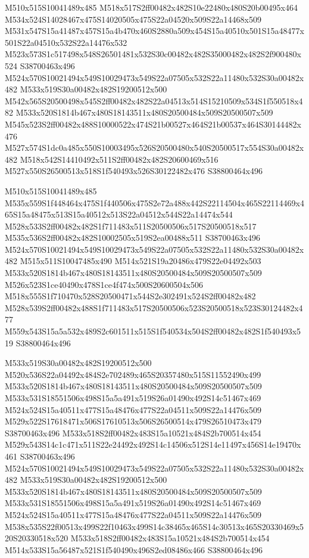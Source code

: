 \documentclass{article}
\begin{document}
\begin{multicols}{2}
M510x515S10041489x485 M518x517S2ff00482x482S10e22480x480S20b00495x464 M534x524S14028467x475S14020505x475S22a04520x509S22a14468x509 M531x547S15a41487x457S15a4b470x460S2880a509x454S15a40510x501S15a48477x501S22a04510x532S22a14476x532 M523x573S1c517498x548S26501481x532S30c00482x482S35000482x482S2f900480x524 S38700463x496 M524x570S10021494x549S10029473x549S22a07505x532S22a11480x532S30a00482x482 M533x519S30a00482x482S19200512x500 M542x565S20500498x545S2ff00482x482S22a04513x514S15210509x534S1f550518x482 M533x520S1814b467x480S18143511x480S20500484x509S20500507x509 M545x523S2ff00482x488S10000522x474S21b00527x464S21b00537x464S30144482x476 M527x574S1dc0a485x550S10003495x526S20500480x540S20500517x554S30a00482x482 M518x542S14410492x511S2ff00482x482S20600469x516 M527x550S26500513x518S1f540493x526S30122482x476 S38800464x496

M510x515S10041489x485 M535x559S1f448464x475S1f440506x475S2e72a488x442S22114504x465S22114469x465S15a48475x513S15a40512x513S22a04512x544S22a14474x544 M528x533S2ff00482x482S1f711483x511S20500506x517S20500518x517 M535x536S2ff00482x482S10002505x519S2ea00488x511 S38700463x496 M524x570S10021494x549S10029473x549S22a07505x532S22a11480x532S30a00482x482 M515x511S10047485x490 M514x521S19a20486x479S22e04492x503 M533x520S1814b467x480S18143511x480S20500484x509S20500507x509 M526x523S1ce40490x478S1ce4f474x500S20600504x506 M518x555S1f710470x528S20500471x544S2e302491x524S2ff00482x482 M528x539S2ff00482x488S1f711483x517S20500506x523S20500518x523S30124482x477 M559x543S15a5a532x489S2c601511x515S1f540534x504S2ff00482x482S1f540493x519 S38800464x496

M533x519S30a00482x482S19200512x500 M520x536S22a04492x484S2e702489x465S20357480x515S11552490x499 M533x520S1814b467x480S18143511x480S20500484x509S20500507x509 M533x531S18551506x498S15a5a491x519S26a01490x492S14c51467x469 M524x524S15a40511x477S15a48476x477S22a04511x509S22a14476x509 M529x522S17618471x506S17610513x506S26500514x479S26510473x479 S38700463x496 M533x518S2ff00482x483S15a10521x484S2b700514x454 M529x543S14c1c471x511S22e24492x492S14c14506x512S14e11497x456S14e19470x461 S38700463x496 M524x570S10021494x549S10029473x549S22a07505x532S22a11480x532S30a00482x482 M533x519S30a00482x482S19200512x500 M533x520S1814b467x480S18143511x480S20500484x509S20500507x509 M533x531S18551506x498S15a5a491x519S26a01490x492S14c51467x469 M524x524S15a40511x477S15a48476x477S22a04511x509S22a14476x509 M538x535S22f00513x499S22f10463x499S14c38465x465S14c30513x465S20330469x520S20330518x520 M533x518S2ff00482x483S15a10521x484S2b700514x454 M514x533S15a56487x521S1f540490x496S2ed08486x466 S38800464x496


\end{multicols}
\end{document}
